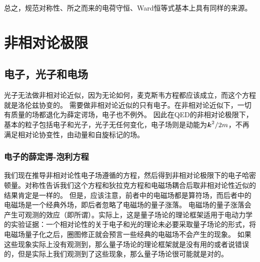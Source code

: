 总之，规范对称性、所之而来的电荷守恒、Ward恒等式基本上具有同样的来源。

\section{非相对论极限}

\subsection{电子，光子和电场}

光子无法做非相对论近似，因为无论如何，麦克斯韦方程都应该成立，而这个方程就是洛伦兹协变的。
需要做非相对论近似的只有电子。在非相对论近似下，一切有质量的场都退化为薛定谔场，电子也不例外。
因此在QED的非相对论极限下，基本的粒子包括电子和光子，光子无任何变化，电子场则是动能为$\vb*{k}^2 / 2m$，不再满足相对论协变性，由动量和自旋标记的场。

\subsubsection{电子的薛定谔-泡利方程}

我们现在推导非相对论性电子场遵循的方程，然后得到非相对论极限下的电子哈密顿量。对称性告诉我们这个方程和狄拉克方程和电磁场耦合后取非相对论性近似的结果肯定是一样的。
但是，应该注意，前者中的电磁场都是算符场，而后者中的电磁场是一个经典外场，即后者忽略了电磁场的量子涨落。
电磁场的量子涨落会产生可观测的效应（即所谓）。实际上，这是量子场论的理论框架适用于电动力学的实验证据：一个相对论性的关于电子和光的理论未必要采取量子场论的形式，将电磁场量子化之后，圈图修正就会预言一些经典的电磁场不会产生的现象。
如果这些现象实际上没有观测到，那么量子场论的理论框架就是没有用的或者说错误的，但是实际上我们观测到了这些现象，那么量子场论很可能就是对的。

